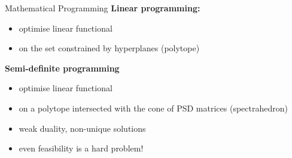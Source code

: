 \documentclass[9pt]{beamer}
\theoremstyle{definition}
\begin{document}
\begin{frame}{Mathematical Programming}
\textbf{Linear programming:}
\begin{itemize}
   \item optimise linear functional
   \item on the set constrained by hyperplanes (polytope)
\end{itemize}
\pause

\textbf{Semi-definite programming}
\begin{itemize}
   \item optimise linear functional
   \item on a polytope intersected with the cone of PSD matrices (spectrahedron)
   \item weak duality, non-unique solutions
   \item even feasibility is a hard problem!
\end{itemize}

\end{frame}
\end{document}
